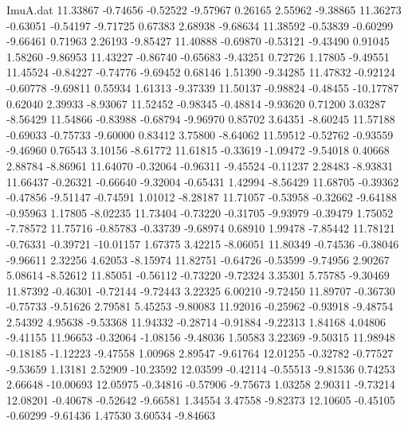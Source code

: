 \begin{filecontents}{ImuA.dat}
  11.33867   -0.74656   -0.52522   -9.57967    0.26165    2.55962   -9.38865
  11.36273   -0.63051   -0.54197   -9.71725    0.67383    2.68938   -9.68634
  11.38592   -0.53839   -0.60299   -9.66461    0.71963    2.26193   -9.85427
  11.40888   -0.69870   -0.53121   -9.43490    0.91045    1.58260   -9.86953
  11.43227   -0.86740   -0.65683   -9.43251    0.72726    1.17805   -9.49551
  11.45524   -0.84227   -0.74776   -9.69452    0.68146    1.51390   -9.34285
  11.47832   -0.92124   -0.60778   -9.69811    0.55934    1.61313   -9.37339
  11.50137   -0.98824   -0.48455  -10.17787    0.62040    2.39933   -8.93067
  11.52452   -0.98345   -0.48814   -9.93620    0.71200    3.03287   -8.56429
  11.54866   -0.83988   -0.68794   -9.96970    0.85702    3.64351   -8.60245
  11.57188   -0.69033   -0.75733   -9.60000    0.83412    3.75800   -8.64062
  11.59512   -0.52762   -0.93559   -9.46960    0.76543    3.10156   -8.61772
  11.61815   -0.33619   -1.09472   -9.54018    0.40668    2.88784   -8.86961
  11.64070   -0.32064   -0.96311   -9.45524   -0.11237    2.28483   -8.93831
  11.66437   -0.26321   -0.66640   -9.32004   -0.65431    1.42994   -8.56429
  11.68705   -0.39362   -0.47856   -9.51147   -0.74591    1.01012   -8.28187
  11.71057   -0.53958   -0.32662   -9.64188   -0.95963    1.17805   -8.02235
  11.73404   -0.73220   -0.31705   -9.93979   -0.39479    1.75052   -7.78572
  11.75716   -0.85783   -0.33739   -9.68974    0.68910    1.99478   -7.85442
  11.78121   -0.76331   -0.39721  -10.01157    1.67375    3.42215   -8.06051
  11.80349   -0.74536   -0.38046   -9.96611    2.32256    4.62053   -8.15974
  11.82751   -0.64726   -0.53599   -9.74956    2.90267    5.08614   -8.52612
  11.85051   -0.56112   -0.73220   -9.72324    3.35301    5.75785   -9.30469
  11.87392   -0.46301   -0.72144   -9.72443    3.22325    6.00210   -9.72450
  11.89707   -0.36730   -0.75733   -9.51626    2.79581    5.45253   -9.80083
  11.92016   -0.25962   -0.93918   -9.48754    2.54392    4.95638   -9.53368
  11.94332   -0.28714   -0.91884   -9.22313    1.84168    4.04806   -9.41155
  11.96653   -0.32064   -1.08156   -9.48036    1.50583    3.22369   -9.50315
  11.98948   -0.18185   -1.12223   -9.47558    1.00968    2.89547   -9.61764
  12.01255   -0.32782   -0.77527   -9.53659    1.13181    2.52909  -10.23592
  12.03599   -0.42114   -0.55513   -9.81536    0.74253    2.66648  -10.00693
  12.05975   -0.34816   -0.57906   -9.75673    1.03258    2.90311   -9.73214
  12.08201   -0.40678   -0.52642   -9.66581    1.34554    3.47558   -9.82373
  12.10605   -0.45105   -0.60299   -9.61436    1.47530    3.60534   -9.84663

\end{filecontents}

